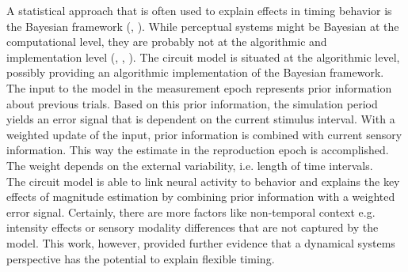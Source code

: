 \documentclass[10pt]{article}
\begin{document}
A statistical approach that is often used to explain effects in timing behavior is the Bayesian framework (\cite{Sohn2019}, \cite{Petzschner2015} \cite{Shi2013} \cite{Petzschner2012}).
While perceptual systems might be Bayesian at the computational level, they are probably not at the algorithmic and implementation level (\cite{Block2018}, \cite{Kwisthout2020}, \cite{marr1976}).
The circuit model is situated at the algorithmic level, possibly providing an algorithmic implementation of the Bayesian framework. %
The input to the model in the measurement epoch represents prior information about previous trials. Based on this prior information, the simulation period yields an error signal that is dependent on the current stimulus interval. With a weighted update of the input, prior information is combined with current sensory information. This way the estimate in the reproduction epoch is accomplished. The weight depends on the external variability, i.e. length of time intervals. \\

The circuit model is able to link neural activity to behavior and explains the key effects of magnitude estimation by combining prior information with a weighted error signal. 
Certainly, there are more factors like non-temporal context e.g. intensity effects or sensory modality differences that are not captured by the model.
This work, however, provided further evidence that a dynamical systems perspective has the potential to explain flexible timing.


\end{document}
